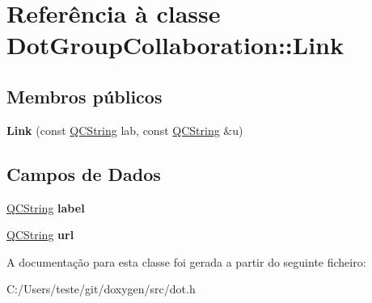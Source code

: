 \hypertarget{class_dot_group_collaboration_1_1_link}{\section{Referência à classe Dot\-Group\-Collaboration\-:\-:Link}
\label{class_dot_group_collaboration_1_1_link}
}
\subsection*{Membros públicos}
\begin{DoxyCompactItemize}
\item 
\hypertarget{class_dot_group_collaboration_1_1_link_aa2f03df7cbffe16d96be51228010c262}{{\bfseries Link} (const \hyperlink{class_q_c_string}{Q\-C\-String} lab, const \hyperlink{class_q_c_string}{Q\-C\-String} \&u)}\label{class_dot_group_collaboration_1_1_link_aa2f03df7cbffe16d96be51228010c262}

\end{DoxyCompactItemize}
\subsection*{Campos de Dados}
\begin{DoxyCompactItemize}
\item 
\hypertarget{class_dot_group_collaboration_1_1_link_ad961cc9bd17b7533dc02fe0826647dc7}{\hyperlink{class_q_c_string}{Q\-C\-String} {\bfseries label}}\label{class_dot_group_collaboration_1_1_link_ad961cc9bd17b7533dc02fe0826647dc7}

\item 
\hypertarget{class_dot_group_collaboration_1_1_link_ae460a12583d5413f9b10d653d645416e}{\hyperlink{class_q_c_string}{Q\-C\-String} {\bfseries url}}\label{class_dot_group_collaboration_1_1_link_ae460a12583d5413f9b10d653d645416e}

\end{DoxyCompactItemize}


A documentação para esta classe foi gerada a partir do seguinte ficheiro\-:\begin{DoxyCompactItemize}
\item 
C\-:/\-Users/teste/git/doxygen/src/dot.\-h\end{DoxyCompactItemize}
